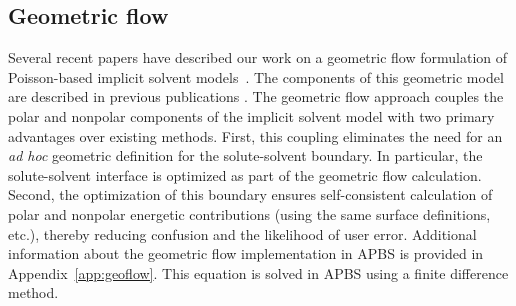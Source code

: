 \documentclass[12pt,titlepage]{article}
\newcommand{\revision}[1]{#1}
\begin{document}
\subsection{Geometric flow} \label{sec:geoflow}
Several recent papers have described our work on a geometric flow formulation of Poisson-based implicit solvent models~\cite{Chen2010, Chen2011, Chen2012, Daily2013, Thomas2013}.
\revision{The components of this geometric model are described in previous publications \cite{Daily2013, Chen2012}.}
The geometric flow approach couples the polar and nonpolar components of the implicit solvent model with two primary \revision{advantages over existing methods}.
First, this coupling eliminates the need for an \textit{ad hoc} geometric definition for the solute-solvent boundary.
In particular, the solute-solvent interface is optimized as part of the geometric flow calculation.
Second, the optimization of this boundary ensures self-consistent calculation of polar and nonpolar energetic contributions (using the same surface definitions, etc.), thereby reducing confusion and the likelihood of user error.
Additional information about the geometric flow implementation in APBS is provided in Appendix~\ref{app:geoflow}.
This equation is solved in APBS using a finite difference method.
\end{document}
